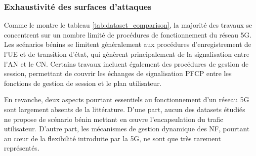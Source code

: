 \documentclass[a4paper,11pt,twoside]{StyleThese}
\begin{document}

\subsubsection{Exhaustivité des surfaces d’attaques}
Comme le montre le tableau \ref{tab:dataset_comparison}, la majorité des travaux se concentrent sur un nombre limité de procédures de fonctionnement du réseau 5G. Les scénarios bénins se limitent généralement aux procédures d'enregistrement de l'UE et de transition d'état, qui génèrent principalement de la signalisation entre l'AN et le CN. Certains travaux incluent également des procédures de gestion de session, permettant de couvrir les échanges de signalisation PFCP entre les fonctions de gestion de session et le plan utilisateur.

En revanche, deux aspects pourtant essentiels au fonctionnement d'un réseau 5G sont largement absents de la littérature. D'une part, aucun des datasets étudiés ne propose de scénario bénin mettant en œuvre l'encapsulation du trafic utilisateur. D'autre part, les mécanismes de gestion dynamique des NF, pourtant au cœur de la flexibilité introduite par la 5G, ne sont que très rarement représentés.
\end{document}
